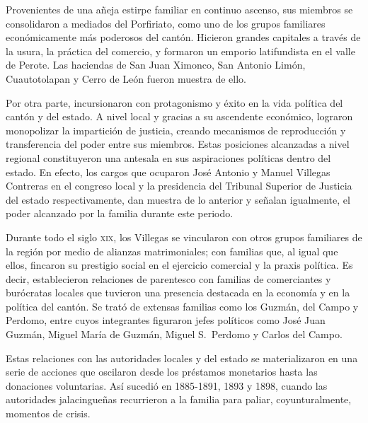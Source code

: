 \documentclass[14pt,twoside,final]{extbook} %
\begin{document}
Provenientes de una añeja estirpe familiar en continuo ascenso, sus miembros se consolidaron a mediados del Porfiriato, como uno de los grupos familiares económicamente más poderosos del cantón. Hicieron grandes capitales a través de la usura, la práctica del comercio, y formaron un emporio latifundista en el valle de Perote. Las haciendas de San Juan Ximonco, San Antonio Limón, Cuautotolapan y Cerro de León fueron muestra de ello.

Por otra parte, incursionaron con protagonismo y éxito en la vida política del cantón y del estado. A nivel local y gracias a su ascendente económico, lograron monopolizar la impartición de justicia, creando mecanismos de reproducción y transferencia del poder entre sus miembros. Estas posiciones alcanzadas a nivel regional constituyeron una antesala en sus aspiraciones políticas dentro del estado. En efecto, los cargos que ocuparon José Antonio y Manuel Villegas Contreras en el congreso local y la presidencia del Tribunal Superior de Justicia del estado respectivamente, dan muestra de lo anterior y señalan igualmente, el poder alcanzado por la familia durante este periodo.

Durante todo el siglo \textsc{xix}, los Villegas se vincularon con otros grupos familiares de la región por medio de alianzas matrimoniales; con familias que, al igual que ellos, fincaron su prestigio social en el ejercicio comercial y la praxis política. Es decir, establecieron relaciones de parentesco con familias de comerciantes y burócratas locales que tuvieron una presencia destacada en la economía y en la política del cantón. Se trató de extensas familias como los Guzmán, del Campo y Perdomo, entre cuyos integrantes figuraron jefes políticos como José Juan Guzmán, Miguel María de Guzmán, Miguel S.~Perdomo y Carlos del Campo.

Estas relaciones con las autoridades locales y del estado se materializaron en una serie de acciones que oscilaron desde los préstamos monetarios hasta las donaciones voluntarias. Así sucedió en 1885-1891, 1893 y 1898, cuando las autoridades jalacingueñas recurrieron a la familia para paliar, coyunturalmente, momentos de crisis.
\end{document}
